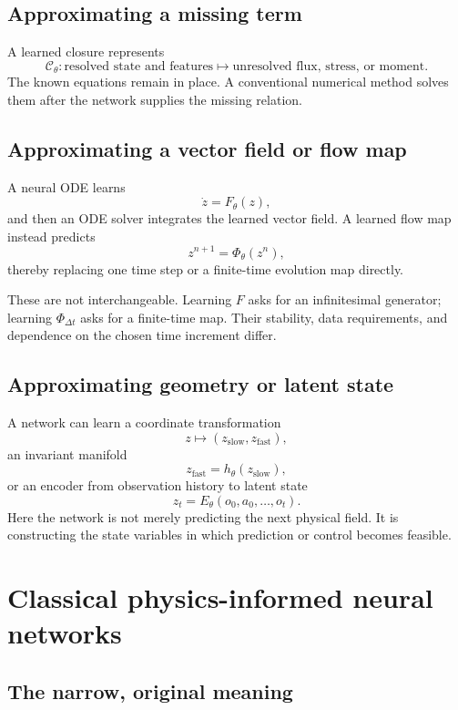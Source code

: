 \documentclass[11pt]{article}
\newcommand{\C}{\mathcal{C}}
\begin{document}
\subsection{Approximating a missing term}

A learned closure represents
\[
 \C_\theta:
 \text{resolved state and features}
 \longmapsto
 \text{unresolved flux, stress, or moment}.
\]
The known equations remain in place. A conventional numerical method solves them after the network supplies the missing relation.

\subsection{Approximating a vector field or flow map}

A neural ODE learns
\[
 \dot z=F_\theta(z),
\]
and then an ODE solver integrates the learned vector field. A learned flow map instead predicts
\[
 z^{n+1}=\Phi_\theta(z^n),
\]
thereby replacing one time step or a finite-time evolution map directly.

These are not interchangeable. Learning \(F\) asks for an infinitesimal generator; learning \(\Phi_{\Delta t}\) asks for a finite-time map. Their stability, data requirements, and dependence on the chosen time increment differ.

\subsection{Approximating geometry or latent state}

A network can learn a coordinate transformation
\[
 z\longmapsto(z_{\mathrm{slow}},z_{\mathrm{fast}}),
\]
an invariant manifold
\[
 z_{\mathrm{fast}}=h_\theta(z_{\mathrm{slow}}),
\]
or an encoder from observation history to latent state
\[
 z_t=E_\theta(o_0,a_0,\ldots,o_t).
\]
Here the network is not merely predicting the next physical field. It is constructing the state variables in which prediction or control becomes feasible.

\section{Classical physics-informed neural networks}

\subsection{The narrow, original meaning}
\end{document}
